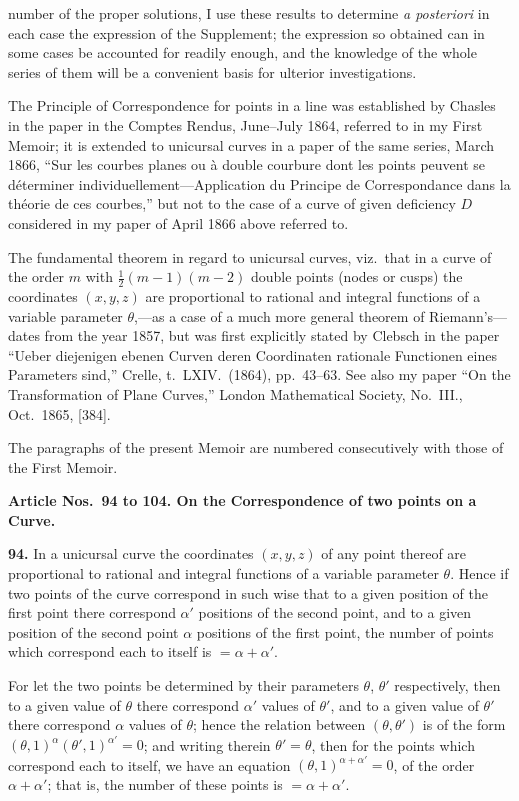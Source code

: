 \documentclass[11pt,a4paper]{article}
\theoremstyle{definition}
\begin{document}
number of the proper solutions, I use these results to determine \textit{a posteriori} in each case the expression of the Supplement; the expression so obtained can in some cases be accounted for readily enough, and the knowledge of the whole series of them will be a convenient basis for ulterior investigations.

The Principle of Correspondence for points in a line was established by Chasles in the paper in the Comptes Rendus, June--July 1864, referred to in my First Memoir; it is extended to unicursal curves in a paper of the same series, March 1866, ``Sur les courbes planes ou \`a double courbure dont les points peuvent se d\'eterminer individuellement---Application du Principe de Correspondance dans la th\'eorie de ces courbes,'' but not to the case of a curve of given deficiency $D$ considered in my paper of April 1866 above referred to.

The fundamental theorem in regard to unicursal curves, viz.\ that in a curve of the order $m$ with $\frac{1}{2}(m-1)(m-2)$ double points (nodes or cusps) the coordinates $(x, y, z)$ are proportional to rational and integral functions of a variable parameter $\theta$,---as a case of a much more general theorem of Riemann's---dates from the year 1857, but was first explicitly stated by Clebsch in the paper ``Ueber diejenigen ebenen Curven deren Coordinaten rationale Functionen eines Parameters sind,'' Crelle, t.~LXIV.\ (1864), pp.~43--63. See also my paper ``On the Transformation of Plane Curves,'' London Mathematical Society, No.~III., Oct.\ 1865, [384].

The paragraphs of the present Memoir are numbered consecutively with those of the First Memoir.

\vspace{6pt}
\noindent\textbf{Article Nos.~94 to 104. On the Correspondence of two points on a Curve.}

\medskip
\noindent\textbf{94.} In a unicursal curve the coordinates $(x, y, z)$ of any point thereof are proportional to rational and integral functions of a variable parameter $\theta$. Hence if two points of the curve correspond in such wise that to a given position of the first point there correspond $\alpha'$ positions of the second point, and to a given position of the second point $\alpha$ positions of the first point, the number of points which correspond each to itself is $= \alpha + \alpha'$.

For let the two points be determined by their parameters $\theta$, $\theta'$ respectively, then to a given value of $\theta$ there correspond $\alpha'$ values of $\theta'$, and to a given value of $\theta'$ there correspond $\alpha$ values of $\theta$; hence the relation between $(\theta, \theta')$ is of the form $(\theta, 1)^{\alpha}(\theta', 1)^{\alpha'} = 0$; and writing therein $\theta' = \theta$, then for the points which correspond each to itself, we have an equation $(\theta, 1)^{\alpha+\alpha'} = 0$, of the order $\alpha + \alpha'$; that is, the number of these points is $= \alpha + \alpha'$.
\end{document}

